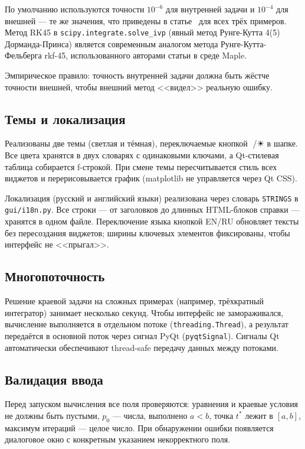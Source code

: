 \documentclass[12pt]{article}
\begin{document}
По умолчанию используются точности $10^{-6}$ для внутренней задачи и $10^{-4}$ для внешней --- те же значения, что приведены в статье~\cite{avvakumov-kiselev-2006} для всех трёх примеров. Метод RK45 в \texttt{scipy.integrate.solve\_ivp} (явный метод Рунге-Кутта 4(5) Дорманда-Принса) является современным аналогом метода Рунге-Кутта-Фельберга rkf-45, использованного авторами статьи в среде Maple.

Эмпирическое правило: точность внутренней задачи должна быть жёстче точности внешней, чтобы внешний метод <<видел>> реальную ошибку.

\subsection{Темы и локализация}

Реализованы две темы (светлая и тёмная), переключаемые кнопкой 🌙/☀ в шапке. Все цвета хранятся в двух словарях с одинаковыми ключами, а Qt-стилевая таблица собирается f-строкой. При смене темы пересчитывается стиль всех виджетов и перерисовывается график (matplotlib не управляется через Qt CSS).

Локализация (русский и английский языки) реализована через словарь \texttt{STRINGS} в \texttt{gui/i18n.py}. Все строки --- от заголовков до длинных HTML-блоков справки --- хранятся в одном файле. Переключение языка кнопкой EN/RU обновляет тексты без пересоздания виджетов; ширины ключевых элементов фиксированы, чтобы интерфейс не <<прыгал>>.

\subsection{Многопоточность}

Решение краевой задачи на сложных примерах (например, трёхкратный интегратор) занимает несколько секунд. Чтобы интерфейс не замораживался, вычисление выполняется в отдельном потоке (\texttt{threading.Thread}), а результат передаётся в основной поток через сигнал PyQt (\texttt{pyqtSignal}). Сигналы Qt автоматически обеспечивают thread-safe передачу данных между потоками.

\subsection{Валидация ввода}

Перед запуском вычисления все поля проверяются: уравнения и краевые условия не должны быть пустыми, $p_0$ --- числа, выполнено $a < b$, точка $t^*$ лежит в $[a, b]$, максимум итераций --- целое число. При обнаружении ошибки появляется диалоговое окно с конкретным указанием некорректного поля.
\end{document}

